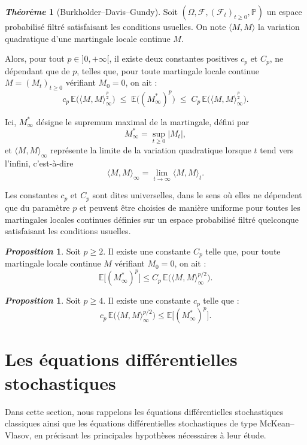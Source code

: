 \documentclass[12pt,a4paper,twoside]{book}%
\theoremstyle{definition}
\newtheorem{thm}[dfn]{\textit{Théorème}}
\newtheorem{prop}[dfn]{\textit{Proposition}}
\numberwithin{equation}{section}
\begin{document}
\begin{thm}[Burkholder--Davis--Gundy]
	Soit $(\Omega,\mathcal{F},(\mathcal{F}_t)_{t\geq 0},\mathbb{P})$ un espace probabilisé filtré satisfaisant les conditions usuelles. On note $\langle M,M\rangle$ la variation quadratique d’une martingale locale continue $M$.
	
	Alors, pour tout $p \in ]0,+\infty[$, il existe deux constantes positives $c_p$ et $C_p$, ne dépendant que de $p$, telles que, pour toute martingale locale continue $M=(M_t)_{t\geq 0}$ vérifiant $M_0 = 0$, on ait :
	\[
	c_p \, \mathbb{E}\big(\langle M,M\rangle_\infty^{\frac{p}{2}}\big)
	\;\leq\;
	\mathbb{E}\big((M^*_\infty)^p\big)
	\;\leq\;
	C_p \, \mathbb{E}\big(\langle M,M\rangle_\infty^{\frac{p}{2}}\big).
	\]
	
	Ici, $M^*_\infty$ désigne le supremum maximal de la martingale, défini par
	\[
	M^*_\infty = \sup_{t \geq 0} |M_t|,
	\]
	et $\langle M,M\rangle_\infty$ représente la limite de la variation quadratique lorsque $t$ tend vers l’infini, c’est-à-dire
	\[
	\langle M,M\rangle_\infty = \lim_{t \to \infty} \langle M,M\rangle_t.
	\]
	
	Les constantes $c_p$ et $C_p$ sont dites universelles, dans le sens où elles ne dépendent que du paramètre $p$ et peuvent être choisies de manière uniforme pour toutes les martingales locales continues définies sur un espace probabilisé filtré quelconque satisfaisant les conditions usuelles.
\end{thm}
\begin{prop}
	Soit $p \geq 2$. Il existe une constante $C_p$ telle que, pour toute martingale locale continue $M$ vérifiant $M_0 = 0$, on ait :
	\[
	\mathbb{E}\big[(M^*_\infty)^p\big] \leq C_p \, \mathbb{E}\big(\langle M,M\rangle_\infty^{p/2}\big).
	\]
	
\end{prop}

\begin{prop}
	Soit $p \geq 4$. Il existe une constante $c_p$ telle que :
	\[
	c_p \, \mathbb{E}\big(\langle M,M\rangle_\infty^{p/2}\big) \leq \mathbb{E}\big[(M^*_\infty)^p\big].
	\]
\end{prop}

\section{Les équations différentielles stochastiques}
Dans cette section, nous rappelons les équations différentielles stochastiques classiques ainsi que les équations différentielles stochastiques de type McKean–Vlasov, en précisant les principales hypothèses nécessaires à leur étude.
\end{document}
